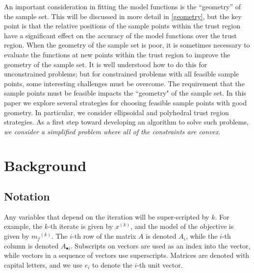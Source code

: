 \documentclass{article}
\theoremstyle{case}
\numberwithin{theorem}{subsection}
\newcommand{\mfk}{{{m}_f}^{(k)}}
\newcommand{\xk}{x^{(k)}}
\begin{document}
An important consideration in fitting the model functions is the ``geometry'' of the sample set.
This will be discussed in more detail in \cref{geometry}, but the key point is that the relative positions of the sample points within the trust region have a significant effect on the accuracy of the model functions over the trust region.
When the geometry of the sample set is poor, it is sometimes necessary to evaluate the functions at new points within the trust region to improve the geometry of the sample set.
It is well understood how to do this for unconstrained problems; but for constrained problems with all feasible sample points, some interesting challenges must be overcome.
The requirement that the sample points must be feasible impacts the ``geometry" of the sample set.
In this paper we explore several strategies for choosing feasible sample points with good geometry.
In particular, we consider ellipsoidal and polyhedral trust region strategies.
As a first step toward developing an algorithm to solve such problems, \emph{we consider a simplified problem where all of the constraints are convex}.


\section{Background}

\subsection{Notation}

Any variables that depend on the iteration will be super-scripted by $k$.
For example, the $k$-th iterate is given by $\xk$, and the model of the objective is given by $\mfk$.
The $i$-th row of the matrix $A$ is denoted $A_i$, while the $i$-th column is denoted $A_{\bullet i}$.
Subscripts on vectors are used as an index into the vector, while vectors in a sequence of vectors use superscripts.
Matrices are denoted with capital letters, and we use $e_i$ to denote the $i$-th unit vector.                     %
\end{document}
